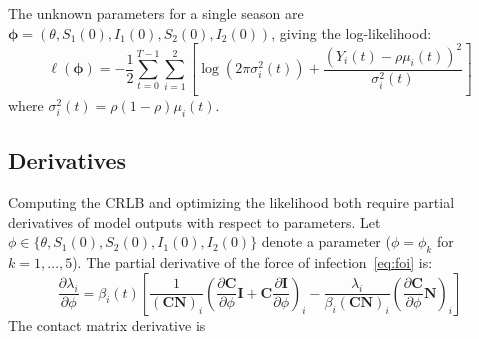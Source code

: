 The unknown parameters for a single season are $\boldsymbol{\phi} =
(\theta, S_1(0), I_1(0), S_2(0), I_2(0))$, giving the log-likelihood:
\begin{equation}\label{eq:loglik}
\ell(\boldsymbol{\phi}) = -\frac{1}{2}\sum_{t=0}^{T-1}\sum_{i=1}^{2}
\left[\log(2\pi \sigma_i^2(t)) + \frac{(Y_i(t) -
    \rho\mu_i(t))^2}{\sigma_i^2(t)}\right]
\end{equation}
where $\sigma_i^2(t) = \rho(1{-}\rho)\mu_i(t)$.

\subsection{Derivatives}\label{subsec:sens}
Computing the CRLB and optimizing the likelihood both require
partial derivatives of model outputs with respect to parameters. Let $\phi \in
\{\theta, S_1(0), S_2(0), I_1(0), I_2(0)\}$ denote a parameter ($\phi
= \phi_k$ for $k = 1, \dots, 5$). The partial derivative of the force
of infection~\eqref{eq:foi} is:
\begin{equation}\label{eq:sens_foi}
\frac{\partial \lambda_i}{\partial \phi} = \beta_i(t) \left[
\frac{1}{(\mathbf{C}\mathbf{N})_i}\left(
  \frac{\partial \mathbf{C}}{\partial \phi} \mathbf{I}
  + \mathbf{C} \frac{\partial \mathbf{I}}{\partial \phi}\right)_i
- \frac{\lambda_i}{\beta_i (\mathbf{C}\mathbf{N})_i}
  \left(\frac{\partial \mathbf{C}}{\partial \phi} \mathbf{N}\right)_i
\right]
\end{equation}
The contact matrix derivative is

